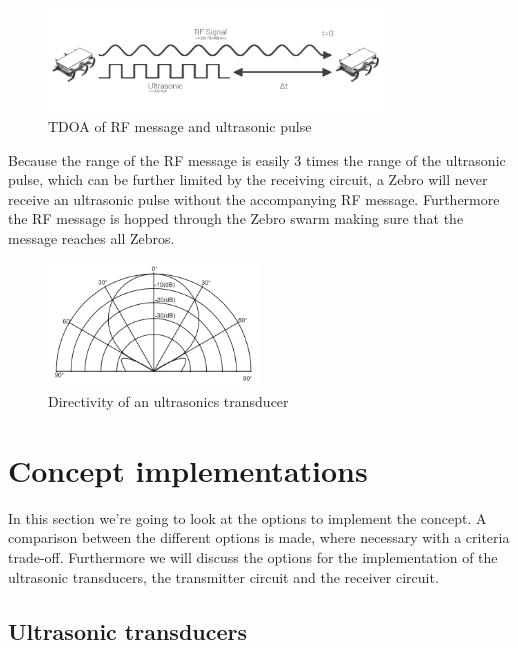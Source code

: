 \begin{figure}[H]
\centering
\includegraphics[width=0.8\textwidth]{Figures/Rf_vs_Us.jpeg}
\caption{TDOA of RF message and ultrasonic pulse}\label{fig:ultra1}
\end{figure}

Because the range of the RF message is easily 3 times the range of the ultrasonic pulse, which can be further limited by the receiving circuit, a Zebro will never receive an ultrasonic pulse without the accompanying RF message. Furthermore the RF message is hopped through the Zebro swarm making sure that the message reaches all Zebros.

\begin{figure}[H]
\centering
\includegraphics[width=0.5\textwidth]{Figures/ultrasonics_transceivers.PNG}
\caption{Directivity of an ultrasonics transducer}\label{fig:ultra2}
\end{figure}


\section{Concept implementations}
In this section we're going to look at the options to implement the concept. A comparison between the different options is made, where necessary with a criteria trade-off. Furthermore we will discuss the options for the implementation of the ultrasonic transducers, the transmitter circuit and the receiver circuit.

\subsection{Ultrasonic transducers}

